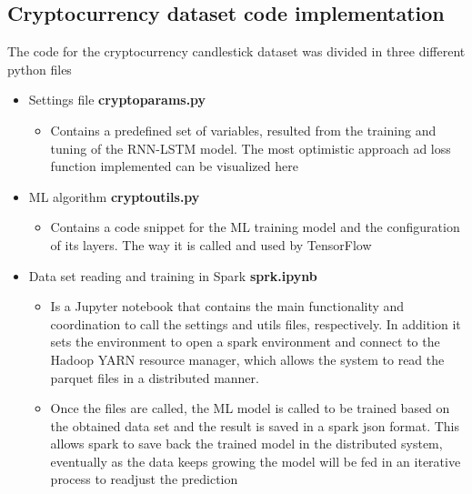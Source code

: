 \subsection{Cryptocurrency dataset code implementation}

The code for the cryptocurrency candlestick dataset was divided in three different python files

\begin{itemize}
    \item Settings file \textbf{crypto\textunderscore params.py}
    \begin{itemize}
        \item Contains a predefined set of variables, resulted from the training and tuning of the RNN-LSTM model. The most optimistic approach ad loss function implemented can be visualized here
    \end{itemize}
    \item ML algorithm  \textbf{crypto\textunderscore utils.py}
    \begin{itemize}
        \item Contains a code snippet for the ML training model and the configuration of its layers. The way it is called and used by TensorFlow
    \end{itemize}
    \item Data set reading and training in Spark  \textbf{sprk.ipynb}
    \begin{itemize}
        \item Is a Jupyter notebook that contains the main functionality and coordination to call the settings and utils files, respectively. In addition it sets the environment to open a spark environment and connect to the Hadoop YARN resource manager, which allows the system to read the parquet files in a distributed manner.
        \item Once the files are called, the ML model is called to be trained based on the obtained data set and the result is saved in a spark json format. This allows spark to save back the trained model in the distributed system, eventually as the data keeps growing the model will be  fed in an iterative process to readjust the prediction
    \end{itemize}
\end{itemize}

